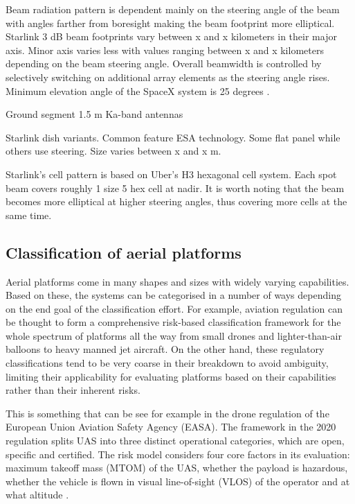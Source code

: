 \documentclass[english, 12pt, a4paper, elec, utf8, a-1b, online]{aaltothesis}
\begin{document}
Beam radiation pattern is dependent mainly on the steering angle of the beam with angles farther from boresight making the beam footprint more elliptical.
Starlink 3 dB beam footprints vary between x and x kilometers in their major axis.
Minor axis varies less with values ranging between x and x kilometers depending on the beam steering angle.
Overall beamwidth is controlled by selectively switching on additional array elements as the steering angle rises.
Minimum elevation angle of the SpaceX system is 25 degrees \cite{spacex2016loa, spacex2020mod}.

Ground segment 1.5 m Ka-band antennas

Starlink dish variants. Common feature ESA technology. Some flat panel while others use steering. Size varies between x and x m.

Starlink's cell pattern is based on Uber's H3 hexagonal cell system. Each spot beam covers roughly 1 size 5 hex cell at nadir. It is worth noting that the beam becomes more elliptical at higher steering angles, thus covering more cells at the same time.

\subsection{Classification of aerial platforms} \label{ch-aerial-platforms}

Aerial platforms come in many shapes and sizes with widely varying capabilities.
Based on these, the systems can be categorised in a number of ways depending on the end goal of the classification effort.
For example, aviation regulation can be thought to form a comprehensive risk-based classification framework for the whole spectrum of platforms all the way from small drones and lighter-than-air balloons to heavy manned jet aircraft.
On the other hand, these regulatory classifications tend to be very coarse in their breakdown to avoid ambiguity, limiting their applicability for evaluating platforms based on their capabilities rather than their inherent risks.

This is something that can be see for example in the drone regulation of the European Union Aviation Safety Agency (EASA).
The framework in the 2020 regulation splits UAS into three distinct operational categories, which are open, specific and certified.
The risk model considers four core factors in its evaluation: maximum takeoff mass (MTOM) of the UAS, whether the payload is hazardous, whether the vehicle is flown in visual line-of-sight (VLOS) of the operator and at what altitude \cite{alamouri2021exploratory}.
\end{document}
